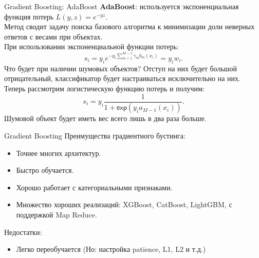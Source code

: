 \documentclass[handout]{beamer}
\begin{document}
\begin{frame}{Gradient Boosting: AdaBoost}
	\textbf{AdaBoost}: используется экспоненциальная функция потерь $L(y, z)=e^{-yz}$.\\
	Метод сводит задачу поиска базового алгоритма к минимизации доли неверных ответов с весами при объектах.\\
	При использовании экспоненциальной функции потерь:
	\begin{equation*}
		s_i=y_ie^{-y_i\sum_{m=1}^{M-1}\gamma_mb_m(x_i)}=y_iw_i.
	\end{equation*}
	Что будет при наличии шумовых объектов? Отступ на них будет большой отрицательный, классификатор будет настраиваться исключительно на них.\\
	Теперь рассмотрим логистическую функцию потерь и получим:
	\begin{equation*}
		s_i=y_i\frac{1}{1+\mathsf{exp}(y_ia_{M-1}(x_i))}.
	\end{equation*}
	Шумовой объект будет иметь вес всего лишь в два раза больше.
\end{frame}

\begin{frame}{Gradient Boosting}
	Преимущества градиентного бустинга:
	\begin{itemize}
		\item Точнее многих архитектур.
		\item Быстро обучается.
		\item Хорошо работает с категориальными признаками.
		\item Множество хороших реализаций: XGBoost, CatBoost, LightGBM, с поддержкой Map Reduce.
	\end{itemize}
Недостатки:
\begin{itemize}
	\item Легко переобучается (Но: настройка patience, L1, L2 и т.д.)
	\end{itemize}
\end{frame}
\end{document}
